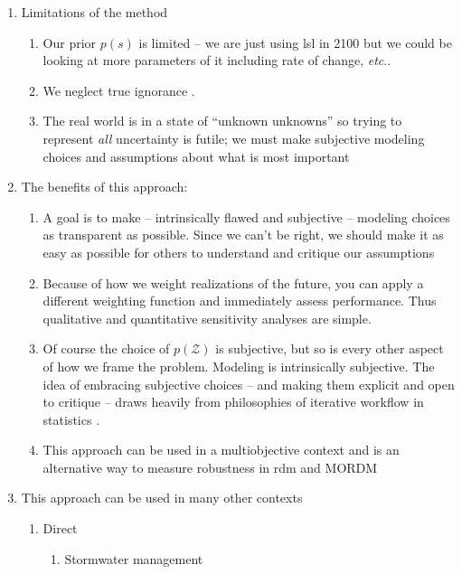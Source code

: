 \documentclass[12pt]{article}
\makeatletter
\newcommand{\james}[1]{\todo[color=giallo, textcolor=nero]{\textbf{ATTN James:~}#1}} %
\DeclareRobustCommand\onedot{\futurelet\@let@token\@onedot}
\def\@onedot{\ifx\@let@token.\else.\null\fi\xspace}
\def\etc{\emph{etc}\onedot} \def\vs{\emph{vs}\onedot}
\DeclareRobustCommand\onedot{\futurelet\@let@token\@onedot}
\def\@onedot{\ifx\@let@token.\else.\null\fi\xspace}
\def\etc{\emph{etc}\onedot} \def\vs{\emph{vs}\onedot}
\makeatother
\begin{document}
\begin{enumerate}
    \item Limitations of the method
          \begin{enumerate}
              \item Our prior $p(s)$ is limited -- we are just using \gls{lsl} in 2100 but we could be looking at more parameters of it including rate of change, \etc
              \item We neglect true ignorance \citep{knight_risk:1921}.
              \item The real world is in a state of ``unknown unknowns'' \citep[level 5 as defined in][fig.~1]{walker_deep:2013} so trying to represent \emph{all} uncertainty is futile; we must make subjective modeling choices and assumptions about what is most important
          \end{enumerate}
    \item The benefits of this approach:
          \begin{enumerate}
              \item A goal is to make -- intrinsically flawed and subjective -- modeling choices as transparent as possible. Since we can't be right, we should make it as easy as possible for others to understand and critique our assumptions\james{Focus on this!}
              \item Because of how we weight realizations of the future, you can apply a different weighting function and immediately assess performance. Thus qualitative and quantitative sensitivity analyses are simple.
              \item Of course the choice of $p(\mathcal{Z})$ is subjective, but so is every other aspect of how we frame the problem. Modeling is intrinsically subjective. The idea of embracing subjective choices -- and making them explicit and open to critique -- draws heavily from philosophies of iterative workflow in statistics \citep{box:1976,gelman_workflow:2020,gelman_philosophy:2013}.
              \item This approach can be used in a multiobjective context and is an alternative way to measure robustness in \gls{rdm} and MORDM
          \end{enumerate}
    \item This approach can be used in many other contexts
          \begin{enumerate}
              \item Direct
                    \begin{enumerate}
                        \item Stormwater management \citep{sharma_rcp:2021,lopez-cantu:2018}

\end{enumerate}
\end{enumerate}
\end{enumerate}
\end{document}
